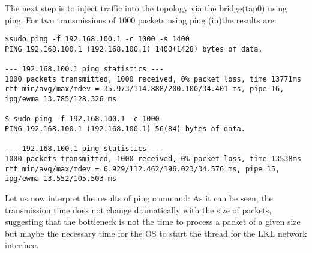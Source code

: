 The next step is to inject traffic into the topology via the bridge(tap0) using ping.
For two transmissions of 1000 packets using ping (in)the results are:
\begin{lstlisting}
$sudo ping -f 192.168.100.1 -c 1000 -s 1400
PING 192.168.100.1 (192.168.100.1) 1400(1428) bytes of data.
                
--- 192.168.100.1 ping statistics ---
1000 packets transmitted, 1000 received, 0% packet loss, time 13771ms
rtt min/avg/max/mdev = 35.973/114.888/200.100/34.401 ms, pipe 16, ipg/ewma 13.785/128.326 ms

$ sudo ping -f 192.168.100.1 -c 1000 
PING 192.168.100.1 (192.168.100.1) 56(84) bytes of data.
               
--- 192.168.100.1 ping statistics ---
1000 packets transmitted, 1000 received, 0% packet loss, time 13538ms
rtt min/avg/max/mdev = 6.929/112.462/196.023/34.576 ms, pipe 15, ipg/ewma 13.552/105.503 ms
\end{lstlisting}
Let us now interpret the results of ping command:
As it can be seen, the transmission time does not change dramatically with the size of packets, suggesting that the bottleneck is not the time to process a packet of a given size but maybe the necessary time for the OS to start the thread for the LKL network interface.
